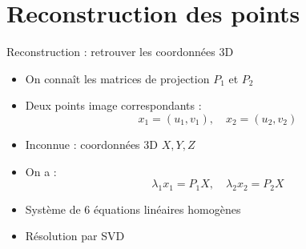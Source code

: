\section{Reconstruction des points}
\begin{frame}{Reconstruction : retrouver les coordonnées 3D}
\begin{minipage}[t]{0.48\textwidth}
  \vspace*{\fill}
  \begin{itemize}
    \item<1-> On connaît les matrices de projection \( P_1 \) et \( P_2 \)
    \item<2-> Deux points image correspondants :
    \vspace*{-0.5em}
    \[
      x_1 = (u_1, v_1),\quad x_2 = (u_2, v_2)
    \]
    \item<3-> Inconnue : coordonnées 3D  \( X , Y, Z \)
    \item<4-> On a :
    \vspace*{-0.5em}
    \[
      \lambda_1 x_1 = P_1 X,\quad \lambda_2 x_2 = P_2 X
    \]
    \item<5-> Système de 6 équations linéaires homogènes
    \item<6-> Résolution par SVD
  \end{itemize}
  \vspace*{\fill}
\end{minipage}
\hfill
\begin{minipage}[t]{0.50\textwidth}
\end{minipage}
\end{frame}



